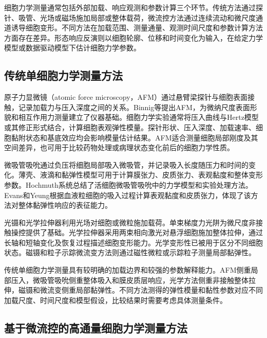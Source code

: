 细胞力学测量通常包括外部加载、响应观测和参数计算三个环节。传统方法通过探针、吸管、光场或磁场施加局部或整体载荷，微流控方法通过连续流动和微尺度通道诱导细胞变形。不同方法在加载范围、测量通量、观测时间尺度和参数计算方法方面存在差异。形态响应反演则以细胞轮廓、位移和时间变化为输入，在给定力学模型或数据驱动模型下估计细胞力学参数。

\subsection{传统单细胞力学测量方法}

原子力显微镜（atomic force microscopy，AFM）通过悬臂梁探针与细胞表面接触，记录加载力与压入深度之间的关系。Binnig等提出AFM，为微纳尺度表面形貌和相互作用力测量建立了仪器基础\cite{binnig1986afm}。细胞力学实验通常将压入曲线与Hertz模型或其修正形式结合，计算细胞表观弹性模量。探针形状、压入深度、加载速率、细胞黏附状态和基底效应均会影响模量估计结果\cite{gavara2016afm}。AFM适合测量细胞局部刚度及其空间差异，也可用于比较药物处理或病理状态变化前后的细胞力学性质\cite{rotsch2000cytoskeletal,cross2007nanomechanical}。

微吸管吸吮通过负压将细胞局部吸入微吸管，并记录吸入长度随压力和时间的变化。薄壳、液滴和黏弹性模型可用于计算膜张力、皮质张力、表观黏度和整体变形参数。Hochmuth系统总结了活细胞微吸管吸吮中的力学模型和实验处理方法\cite{hochmuth2000micropipette}。Evans和Yeung根据血液粒细胞的吸入过程计算表观黏度和皮质张力，体现了该方法对整体黏弹性响应的表征能力\cite{evans1989granulocytes}。

光镊和光学拉伸器利用光场对细胞或微粒施加载荷。单束梯度力光阱为微尺度非接触操控提供了基础\cite{ashkin1986singlebeam}。光学拉伸器采用两束相向激光对悬浮细胞施加整体拉伸，通过长轴和短轴变化及恢复过程描述细胞变形能力\cite{guck2001optical}。光学变形性已被用于区分不同细胞状态\cite{guck2005opticaldeformability}。磁镊和粒子示踪微流变方法则通过磁性微粒或示踪粒子测量局部黏弹性\cite{bausch1999local,waigh2005microrheology}。

传统单细胞力学测量具有较明确的加载边界和较强的参数解释能力。AFM侧重局部压入，微吸管吸吮侧重整体吸入和膜皮质层响应，光学方法侧重非接触整体拉伸，磁镊和微流变侧重局部黏弹性。不同方法测得的弹性模量和黏性参数对应不同加载尺度、时间尺度和模型假设，比较结果时需要考虑具体测量条件\cite{dicarlo2012mechanical,urbanska2020comparison}。

\subsection{基于微流控的高通量细胞力学测量方法}

